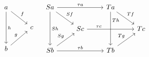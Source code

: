 \begin{figure}[H]
\centering

\[ \begin{array}{cc}
\begin{tikzcd}
	a \arrow[dr, "f"] \arrow[dd, "h"] &   \\
					  				  & c \\
	b \arrow[ur, "g"] 				  &
\end{tikzcd}

&

\begin{tikzcd}
	Sa \arrow[dr, "Sf"] \arrow[dd, "Sh"] \arrow[rr, "\tau a"] &    								   & Ta \arrow[dr, "Tf"] \arrow[dd, "Th" near start] &    \\
					  				     					  & Sc \arrow[rr, "\tau c" near start] & 									   			 & Tc \\
	Sb \arrow[ur, "Sg"] \arrow[rr, "\tau b"]				  &	  								   & Tb \arrow[ur, "Tg"] 				   			 &
\end{tikzcd}
\end{array} \]

\end{figure}